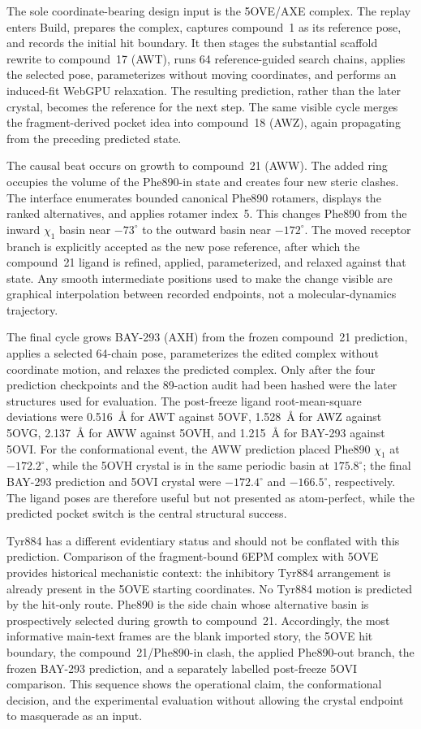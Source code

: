 The sole coordinate-bearing design input is the 5OVE/AXE complex.
The replay enters Build, prepares the complex, captures compound~1 as its
reference pose, and records the initial hit boundary.
It then stages the substantial scaffold rewrite to compound~17 (AWT), runs 64
reference-guided search chains, applies the selected pose, parameterizes without
moving coordinates, and performs an induced-fit WebGPU relaxation.
The resulting prediction, rather than the later crystal, becomes the reference
for the next step.
The same visible cycle merges the fragment-derived pocket idea into compound~18
(AWZ), again propagating from the preceding predicted state.

The causal beat occurs on growth to compound~21 (AWW).
The added ring occupies the volume of the Phe890-in state and creates four new
steric clashes.
The interface enumerates bounded canonical Phe890 rotamers, displays the ranked
alternatives, and applies rotamer index~5.
This changes Phe890 from the inward $\chi_1$ basin near $-73^\circ$ to the
outward basin near $-172^\circ$.
The moved receptor branch is explicitly accepted as the new pose reference,
after which the compound~21 ligand is refined, applied, parameterized, and
relaxed against that state.
Any smooth intermediate positions used to make the change visible are graphical
interpolation between recorded endpoints, not a molecular-dynamics trajectory.

The final cycle grows BAY-293 (AXH) from the frozen compound~21 prediction,
applies a selected 64-chain pose, parameterizes the edited complex without
coordinate motion, and relaxes the predicted complex.
Only after the four prediction checkpoints and the 89-action audit had been
hashed were the later structures used for evaluation.
The post-freeze ligand root-mean-square deviations were 0.516~\AA{} for AWT
against 5OVF, 1.528~\AA{} for AWZ against 5OVG, 2.137~\AA{} for AWW against
5OVH, and 1.215~\AA{} for BAY-293 against 5OVI.
For the conformational event, the AWW prediction placed Phe890 $\chi_1$ at
$-172.2^\circ$, while the 5OVH crystal is in the same periodic basin at
$175.8^\circ$; the final BAY-293 prediction and 5OVI crystal were
$-172.4^\circ$ and $-166.5^\circ$, respectively.
The ligand poses are therefore useful but not presented as atom-perfect, while
the predicted pocket switch is the central structural success.

Tyr884 has a different evidentiary status and should not be conflated with this
prediction.
Comparison of the fragment-bound 6EPM complex with 5OVE provides historical
mechanistic context: the inhibitory Tyr884 arrangement is already present in
the 5OVE starting coordinates.
No Tyr884 motion is predicted by the hit-only route.
Phe890 is the side chain whose alternative basin is prospectively selected
during growth to compound~21.
Accordingly, the most informative main-text frames are the blank imported
story, the 5OVE hit boundary, the compound~21/Phe890-in clash, the applied
Phe890-out branch, the frozen BAY-293 prediction, and a separately labelled
post-freeze 5OVI comparison.
This sequence shows the operational claim, the conformational decision, and the
experimental evaluation without allowing the crystal endpoint to masquerade as
an input.
